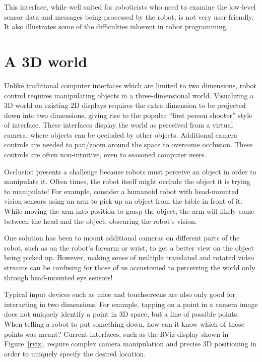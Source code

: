 \documentclass[10pt,twocolumn]{article}
\begin{document}
This interface, while well suited for roboticists who need to examine the low-level sensor data and messages being processed by the robot, is not very user-friendly. It also illustrates some of the difficulties inherent in robot programming.

\section{A 3D world}


Unlike traditional computer interfaces which are limited to two dimensions, robot control requires manipulating objects in a three-dimensional world. Visualizing a 3D world on existing 2D displays requires the extra dimension to be projected down into two dimensions, giving rise to the popular ``first person shooter'' style of interface. These interfaces display the world as perceived from a virtual camera, where objects can be occluded by other objects. Additional camera controls are needed to pan/zoom around the space to overcome occlusion. These controls are often non-intuitive, even to seasoned computer users.

Occlusion presents a challenge because robots must perceive an object in order to manipulate it.  Often times, the robot itself might occlude the object it is trying to manipulate! For example, consider a humanoid robot with head-mounted vision sensors using an arm to pick up an object from the table in front of it. While moving the arm into position to grasp the object, the arm will likely come between the head and the object, obscuring the robot's vision.

One solution has been to mount additional cameras on different parts of the robot, such as on the robot's forearm or wrist, to get a better view on the object being picked up. However, making sense of multiple translated and rotated video streams can be confusing for those of us accustomed to perceiving the world only through head-mounted eye sensors!

Typical input devices such as mice and touchscreens are also only good for interacting in two dimensions. For example, tapping on a point in a camera image does not uniquely identify a point in 3D space, but a line of possible points. When telling a robot to put something down, how can it know which of those points was meant? Current interfaces, such as the RViz display shown in Figure~\ref{rviz}, require complex camera manipulation and precise 3D positioning in order to uniquely specify the desired location.
\end{document}

